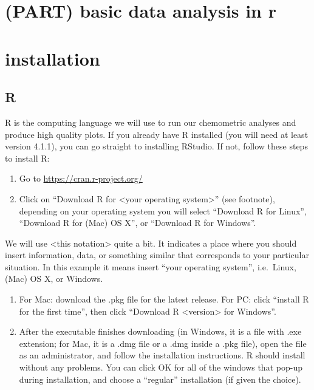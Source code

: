 \documentclass[
]{krantz}
\begin{document}
\hypertarget{part-basic-data-analysis-in-r}{%
\section{(PART) basic data analysis in r}\label{part-basic-data-analysis-in-r}}

\hypertarget{installation}{%
\section*{installation}\label{installation}}

\hypertarget{r}{%
\subsection{R}\label{r}}

R is the computing language we will use to run our chemometric analyses and produce high quality plots. If you already have R installed (you will need at least version 4.1.1), you can go straight to installing RStudio. If not, follow these steps to install R:

\begin{enumerate}
\def\labelenumi{\arabic{enumi}.}
\item
  Go to \url{https://cran.r-project.org/}
\item
  Click on ``Download R for \textless your operating system\textgreater{}'' (see footnote), depending on your operating system you will select ``Download R for Linux'', ``Download R for (Mac) OS X'', or ``Download R for Windows''.
\end{enumerate}

We will use \textless this notation\textgreater{} quite a bit. It indicates a place where you should insert information, data, or something similar that corresponds to your particular situation. In this example it means insert ``your operating system'', i.e.~Linux, (Mac) OS X, or Windows.

\begin{enumerate}
\def\labelenumi{\arabic{enumi}.}
\setcounter{enumi}{2}
\item
  For Mac: download the .pkg file for the latest release. For PC: click ``install R for the first time'', then click ``Download R \textless version\textgreater{} for Windows''.
\item
  After the executable finishes downloading (in Windows, it is a file with .exe extension; for Mac, it is a .dmg file or a .dmg inside a .pkg file), open the file as an administrator, and follow the installation instructions. R should install without any problems. You can click OK for all of the windows that pop-up during installation, and choose a ``regular'' installation (if given the choice).
\end{enumerate}
\end{document}
